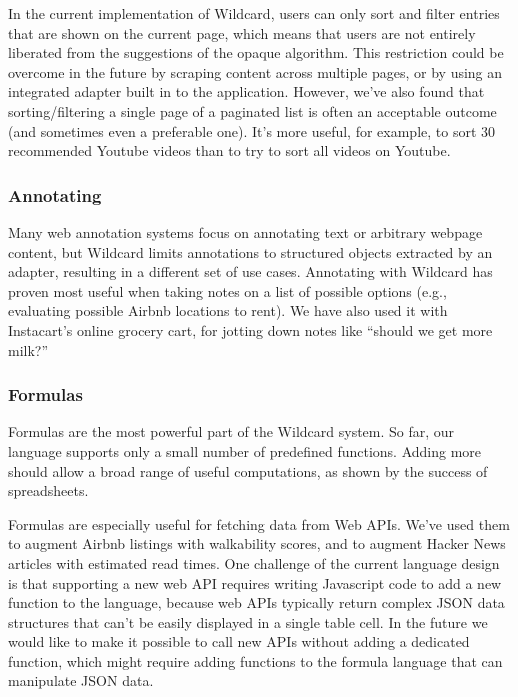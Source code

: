\documentclass[sigplan,screen,10pt,anonymous,review]{acmart}
\begin{document}
In the current implementation of Wildcard, users can only sort and
filter entries that are shown on the current page, which means that
users are not entirely liberated from the suggestions of the opaque
algorithm. This restriction could be overcome in the future by scraping
content across multiple pages, or by using an integrated adapter built
in to the application. However, we've also found that sorting/filtering
a single page of a paginated list is often an acceptable outcome (and
sometimes even a preferable one). It's more useful, for example, to sort
30 recommended Youtube videos than to try to sort all videos on Youtube.

\hypertarget{annotating}{%
\subsubsection{Annotating}\label{annotating}}

Many web annotation systems focus on annotating text or arbitrary
webpage content, but Wildcard limits annotations to structured objects
extracted by an adapter, resulting in a different set of use cases.
Annotating with Wildcard has proven most useful when taking notes on a
list of possible options (e.g., evaluating possible Airbnb locations to
rent). We have also used it with Instacart's online grocery cart, for
jotting down notes like ``should we get more milk?''

\hypertarget{formulas}{%
\subsubsection{Formulas}\label{formulas}}

Formulas are the most powerful part of the Wildcard system. So far, our
language supports only a small number of predefined functions. Adding
more should allow a broad range of useful computations, as shown by the
success of spreadsheets.

Formulas are especially useful for fetching data from Web APIs. We've
used them to augment Airbnb listings with walkability scores, and to
augment Hacker News articles with estimated read times. One challenge of
the current language design is that supporting a new web API requires
writing Javascript code to add a new function to the language, because
web APIs typically return complex JSON data structures that can't be
easily displayed in a single table cell. In the future we would like to
make it possible to call new APIs without adding a dedicated function,
which might require adding functions to the formula language that can
manipulate JSON data.
\end{document}
